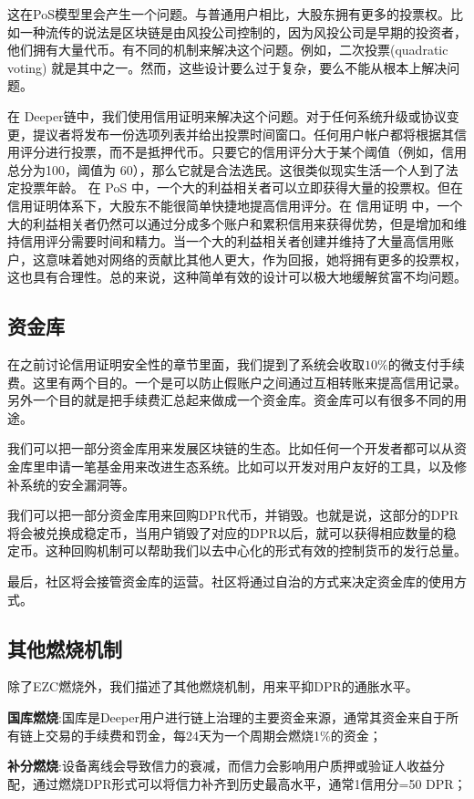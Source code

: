 \documentclass[a4paper]{article}
\begin{document}
这在PoS模型里会产生一个问题。与普通用户相比，大股东拥有更多的投票权。比如一种流传的说法是区块链是由风投公司控制的，因为风投公司是早期的投资者，他们拥有大量代币。有不同的机制来解决这个问题。例如，二次投票(quadratic voting) 就是其中之一。然而，这些设计要么过于复杂，要么不能从根本上解决问题。

在 Deeper链中，我们使用信用证明来解决这个问题。对于任何系统升级或协议变更，提议者将发布一份选项列表并给出投票时间窗口。任何用户帐户都将根据其信用评分进行投票，而不是抵押代币。只要它的信用评分大于某个阈值（例如，信用总分为100，阈值为 60），那么它就是合法选民。这很类似现实生活一个人到了法定投票年龄。
在 PoS 中，一个大的利益相关者可以立即获得大量的投票权。但在信用证明体系下，大股东不能很简单快捷地提高信用评分。在 信用证明 中，一个大的利益相关者仍然可以通过分成多个账户和累积信用来获得优势，但是增加和维持信用评分需要时间和精力。当一个大的利益相关者创建并维持了大量高信用账户，这意味着她对网络的贡献比其他人更大，作为回报，她将拥有更多的投票权，这也具有合理性。总的来说，这种简单有效的设计可以极大地缓解贫富不均问题。


\subsection{资金库}
在之前讨论信用证明安全性的章节里面，我们提到了系统会收取$10\%$的微支付手续费。这里有两个目的。一个是可以防止假账户之间通过互相转账来提高信用记录。另外一个目的就是把手续费汇总起来做成一个资金库。资金库可以有很多不同的用途。

我们可以把一部分资金库用来发展区块链的生态。比如任何一个开发者都可以从资金库里申请一笔基金用来改进生态系统。比如可以开发对用户友好的工具，以及修补系统的安全漏洞等。

我们可以把一部分资金库用来回购DPR代币，并销毁。也就是说，这部分的DPR将会被兑换成稳定币，当用户销毁了对应的DPR以后，就可以获得相应数量的稳定币。这种回购机制可以帮助我们以去中心化的形式有效的控制货币的发行总量。

最后，社区将会接管资金库的运营。社区将通过自治的方式来决定资金库的使用方式。


\subsection{其他燃烧机制}
除了EZC燃烧外，我们描述了其他燃烧机制，用来平抑DPR的通胀水平。

\textbf{国库燃烧}:国库是Deeper用户进行链上治理的主要资金来源，通常其资金来自于所有链上交易的手续费和罚金，每24天为一个周期会燃烧1$\%$的资金；

\textbf{补分燃烧}:设备离线会导致信力的衰减，而信力会影响用户质押或验证人收益分配，通过燃烧DPR形式可以将信力补齐到历史最高水平，通常1信用分=50 DPR；
\end{document}
